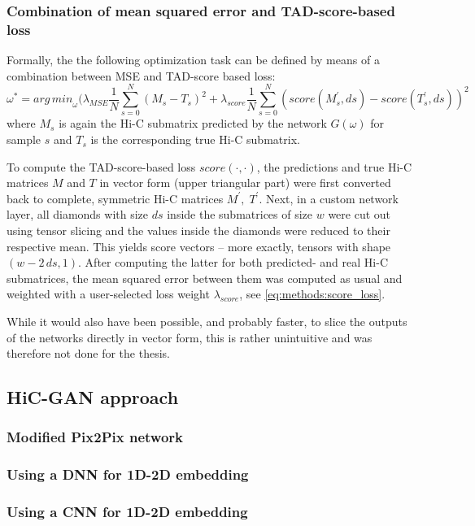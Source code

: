 \subsubsection{Combination of mean squared error and TAD-score-based loss} \label{sec:methods:score_loss}
Formally, the the following optimization task can be defined by means of a combination between MSE and TAD-score based loss:
\begin{equation}
 \omega^* = \mathit{arg\,min}_\omega (  \lambda_\mathit{MSE} \frac{1}{N} \sum_{s=0}^N (M_s - T_s)^2
                                                    + \lambda_\mathit{score} \frac{1}{N} \sum_{s=0}^N (\mathit{score}(M^\prime_s,ds) - \mathit{score}(T^\prime_s,ds))^2 \label{eq:methods:score_loss}
\end{equation}
where $M_s$ is again the Hi-C submatrix predicted by the network $G(\omega)$ for sample $s$ and $T_s$ is the corresponding true Hi-C submatrix.

To compute the TAD-score-based loss $\mathit{score}(\cdot,\cdot)$, the predictions and true Hi-C matrices $M$ and $T$ in vector form (upper triangular part)
were first converted back to complete, symmetric Hi-C matrices $M^\prime,\; T^\prime$. 
Next, in a custom network layer, all diamonds with size $ds$ inside the submatrices of size $w$ were cut out using tensor slicing and the values inside the diamonds were reduced to their respective mean.
This yields score vectors -- more exactly, tensors with shape $(w - 2\,ds, 1)$.
After computing the latter for both predicted- and real Hi-C submatrices, the mean squared error between them was computed as usual and weighted with 
a user-selected loss weight $\lambda_\mathit{score}$, see \cref{eq:methods:score_loss}.

While it would also have been possible, and probably faster, to slice the outputs of the networks directly in vector form, 
this is rather unintuitive and was therefore not done for the thesis. 

\subsection{HiC-GAN approach}
\subsubsection{Modified Pix2Pix network}\label{sec:methods:cGAN_initial}
\subsubsection{Using a DNN for 1D-2D embedding}
\subsubsection{Using a CNN for 1D-2D embedding}









